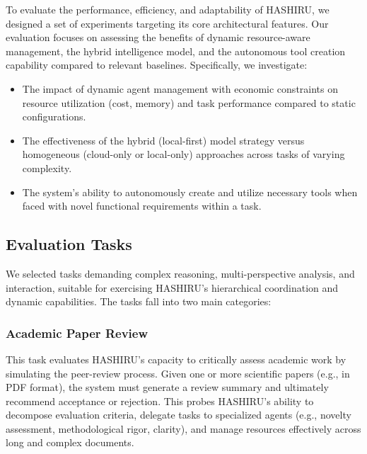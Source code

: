 \documentclass[conference]{IEEEtran}
\begin{document}
To evaluate the performance, efficiency, and adaptability of HASHIRU, we designed a set of experiments targeting its core architectural features. Our evaluation focuses on assessing the benefits of dynamic resource-aware management, the hybrid intelligence model, and the autonomous tool creation capability compared to relevant baselines. Specifically, we investigate:
\begin{itemize}
    \item The impact of dynamic agent management with economic constraints on resource utilization (cost, memory) and task performance compared to static configurations.
    \item The effectiveness of the hybrid (local-first) model strategy versus homogeneous (cloud-only or local-only) approaches across tasks of varying complexity.
    \item The system's ability to autonomously create and utilize necessary tools when faced with novel functional requirements within a task.
\end{itemize}

\subsection{Evaluation Tasks}
\label{subsec:tasks}
We selected tasks demanding complex reasoning, multi-perspective analysis, and interaction, suitable for exercising HASHIRU's hierarchical coordination and dynamic capabilities. The tasks fall into two main categories:

\subsubsection{Academic Paper Review}
This task evaluates HASHIRU's capacity to critically assess academic work by simulating the peer-review process. Given one or more scientific papers (e.g., in PDF format), the system must generate a review summary and ultimately recommend acceptance or rejection. This probes HASHIRU's ability to decompose evaluation criteria, delegate tasks to specialized agents (e.g., novelty assessment, methodological rigor, clarity), and manage resources effectively across long and complex documents.
\end{document}
